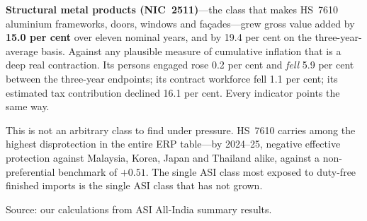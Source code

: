 \documentclass[11pt, a4paper]{article}
\numberwithin{figure}{section}
\numberwithin{table}{section}
\begin{document}
\textbf{Structural metal products (NIC~2511)}---the class that makes HS~7610 aluminium frameworks, doors, windows and fa\c{c}ades---grew gross value added by \textbf{15.0 per cent} over eleven nominal years, and by 19.4 per cent on the three-year-average basis. Against any plausible measure of cumulative inflation that is a deep real contraction. Its persons engaged rose 0.2 per cent and \emph{fell} 5.9 per cent between the three-year endpoints; its contract workforce fell 1.1 per cent; its estimated tax contribution declined 16.1 per cent. Every indicator points the same way.

This is not an arbitrary class to find under pressure. HS~7610 carries among the highest disprotection in the entire ERP table---by 2024--25, negative effective protection against Malaysia, Korea, Japan and Thailand alike, against a non-preferential benchmark of $+0.51$. The single ASI class most exposed to duty-free finished imports is the single ASI class that has not grown.

\begin{table}[H]
    \centering
    \caption{Percentage change by NIC class, 2011--12 to 2022--23 (nominal)}
    \label{tab:asi_growth}

    \vspace{0.2cm}
    \raggedright
    \small Source: our calculations from ASI All-India summary results.
\end{table}
\end{document}
